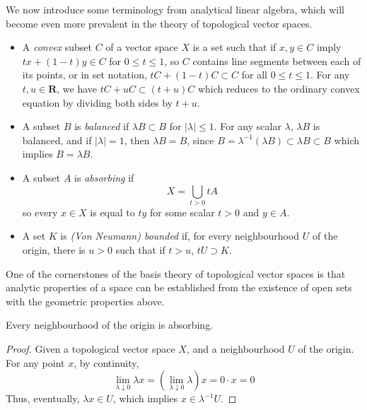 We now introduce some terminology from analytical linear algebra, which will become even more prevalent in the theory of topological vector spaces.
%
\begin{itemize}
    \item A \emph{convex} subset $C$ of a vector space $X$ is a set such that if $x, y \in C$ imply $tx + (1 - t) y \in C$ for $0 \leq t \leq 1$, so $C$ contains line segments between each of its points, or in set notation, $tC + (1 - t)C \subset C$ for all $0 \leq t \leq 1$. For any $t, u \in \mathbf{R}$, we have $tC + uC \subset (t + u) C$ which reduces to the ordinary convex equation by dividing both sides by $t + u$.

    \item A subset $B$ is \emph{balanced} if $\lambda B \subset B$ for $|\lambda| \leq 1$. For any scalar $\lambda$, $\lambda B$ is balanced, and if $|\lambda| = 1$, then $\lambda B = B$, since $B = \lambda^{-1}(\lambda B) \subset \lambda B \subset B$
    which implies $B = \lambda B$.

    \item A subset $A$ is \emph{absorbing} if
    \[ X = \bigcup_{t > 0} tA \]
    so every $x \in X$ is equal to $ty$ for some scalar $t > 0$ and $y \in A$.

    \item A set $K$ is \emph{(Von Neumann) bounded} if, for every neighbourhood $U$ of the origin, there is $u > 0$ such that if $t > u$, $tU \supset K$.

\end{itemize}
%
One of the cornerstones of the basis theory of topological vector spaces is that analytic properties of a space can be established from the existence of open sets with the geometric properties above.

\begin{theorem}
    Every neighbourhood of the origin is absorbing.
\end{theorem}
\begin{proof}
    Given a topological vector space $X$, and a neighbourhood $U$ of the origin. For any point $x$, by continuity,
    \[ \lim_{\lambda \downarrow 0} \lambda x = \left( \lim_{\lambda \downarrow 0} \lambda \right) x = 0 \cdot x = 0 \]
    Thus, eventually, $\lambda x \in U$, which implies $x \in \lambda^{-1} U$.
\end{proof}

